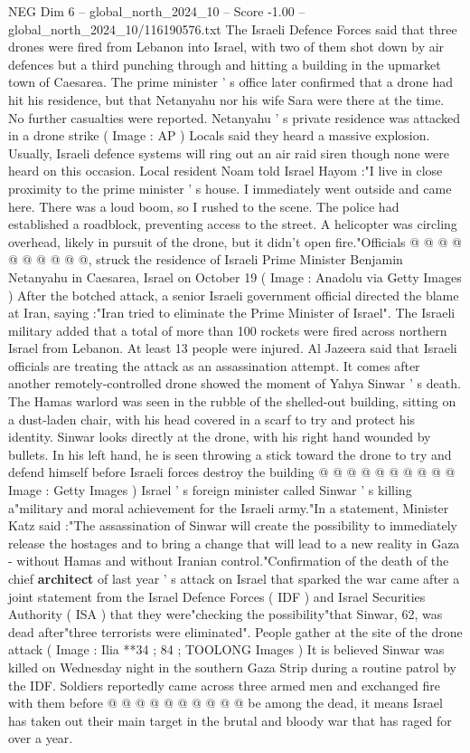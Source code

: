 \begin{textsample}{NEG Dim 6 – global\_north\_2024\_10 – Score -1.00 – global\_north\_2024\_10/116190576.txt}  \label{ex:f6_neg_053}
The Israeli Defence Forces said that three drones were fired from Lebanon into Israel, with two of them shot down by air defences but a third punching through and hitting a building in the upmarket town of Caesarea.
The prime minister ' s office later confirmed that a drone had hit his residence, but that Netanyahu nor his wife Sara were there at the time.
No further casualties were reported.
Netanyahu ' s private residence was attacked in a drone strike ( Image : AP ) Locals said they heard a massive explosion.
Usually, Israeli defence systems will ring out an air raid siren though none were heard on this occasion.
Local resident Noam told Israel Hayom :"I live in close proximity to the prime minister ' s house.
I immediately went outside and came here.
There was a loud boom, so I rushed to the scene.
The police had established a roadblock, preventing access to the street.
A helicopter was circling overhead, likely in pursuit of the drone, but it didn't open fire."Officials @ @ @ @ @ @ @ @ @ @, struck the residence of Israeli Prime Minister Benjamin Netanyahu in Caesarea, Israel on October 19 ( Image : Anadolu via Getty Images ) After the botched attack, a senior Israeli government official directed the blame at Iran, saying :"Iran tried to eliminate the Prime Minister of Israel".
The Israeli military added that a total of more than 100 rockets were fired across northern Israel from Lebanon.
At least 13 people were injured.
Al Jazeera said that Israeli officials are treating the attack as an assassination attempt.
It comes after another remotely-controlled drone showed the moment of Yahya Sinwar ' s death.
The Hamas warlord was seen in the rubble of the shelled-out building, sitting on a dust-laden chair, with his head covered in a scarf to try and protect his identity.
Sinwar looks directly at the drone, with his right hand wounded by bullets.
In his left hand, he is seen throwing a stick toward the drone to try and defend himself before Israeli forces destroy the building @ @ @ @ @ @ @ @ @ @ Image : Getty Images ) Israel ' s foreign minister called Sinwar ' s killing a"military and moral achievement for the Israeli army."In a statement, Minister Katz said :"The assassination of Sinwar will create the possibility to immediately release the hostages and to bring a change that will lead to a new reality in Gaza - without Hamas and without Iranian control."Confirmation of the death of the chief \textbf{architect} of last year ' s attack on Israel that sparked the war came after a joint statement from the Israel Defence Forces ( IDF ) and Israel Securities Authority ( ISA ) that they were"checking the possibility"that Sinwar, 62, was dead after"three terrorists were eliminated".
People gather at the site of the drone attack ( Image : Ilia **34 ; 84 ; TOOLONG Images ) It is believed Sinwar was killed on Wednesday night in the southern Gaza Strip during a routine patrol by the IDF.
Soldiers reportedly came across three armed men and exchanged fire with them before @ @ @ @ @ @ @ @ @ @ be among the dead, it means Israel has taken out their main target in the brutal and bloody war that has raged for over a year.

\end{textsample}
